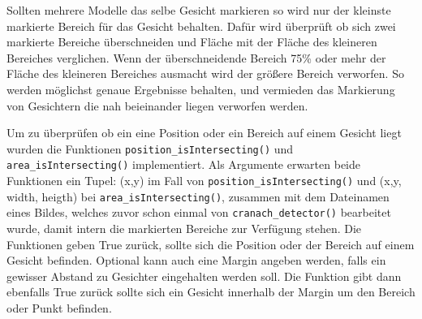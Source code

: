 Sollten mehrere Modelle das selbe Gesicht markieren so wird nur der kleinste markierte Bereich für das Gesicht behalten. Dafür wird überprüft ob sich zwei markierte Bereiche überschneiden und Fläche mit der Fläche des kleineren Bereiches verglichen. Wenn der überschneidende Bereich 75\% oder mehr der Fläche des kleineren Bereiches ausmacht wird der größere Bereich verworfen. So werden möglichst genaue Ergebnisse behalten, und vermieden das Markierung von Gesichtern die nah beieinander liegen verworfen werden.

Um zu überprüfen ob ein eine Position oder ein Bereich auf einem Gesicht liegt wurden die Funktionen \texttt{position\_isIntersecting()} und \texttt{area\_isIntersecting()} implementiert. Als Argumente erwarten beide Funktionen ein Tupel: (x,y) im Fall von \texttt{position\_isIntersecting()} und (x,y, width, heigth) bei \texttt{area\_isIntersecting()}, zusammen mit dem Dateinamen eines Bildes, welches zuvor schon einmal von \texttt{cranach\_detector()} bearbeitet wurde, damit intern die markierten Bereiche zur Verfügung stehen. Die Funktionen geben True zurück, sollte sich die Position oder der Bereich auf einem Gesicht befinden.
Optional kann auch eine Margin angeben werden, falls ein gewisser Abstand zu Gesichter eingehalten werden soll. Die Funktion gibt dann ebenfalls True zurück sollte sich ein Gesicht innerhalb der Margin um den Bereich oder Punkt befinden.